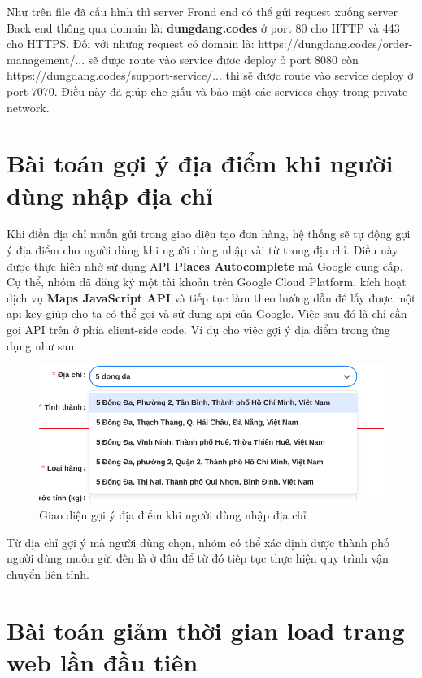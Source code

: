 		Như trên file đã cấu hình thì server Frond end có thể gửi request xuống server Back end thông qua domain là: \textbf{dungdang.codes} ở port 80 cho HTTP và 443 cho HTTPS. Đối với những request có domain là: https://dungdang.codes/order-management/... sẽ được route vào service đươc deploy ở port 8080 còn https://dungdang.codes/support-service/... thì sẽ được route vào service deploy ở port 7070. Điều này đã giúp che giấu và bảo mật các services chạy trong private network.
		
		  \section{Bài toán gợi ý địa điểm khi người dùng nhập địa chỉ}
		  
		  Khi điền địa chỉ muốn gửi trong giao diện tạo đơn hàng, hệ thống sẽ tự động gợi ý địa điểm cho người dùng khi người dùng nhập vài từ trong địa chỉ. Điều này được thực hiện nhờ sử dụng API \textbf{Places Autocomplete} mà Google cung cấp. Cụ thể, nhóm đã đăng ký một tài khoản trên Google Cloud Platform, kích hoạt dịch vụ \textbf{Maps JavaScript API} và tiếp tục làm theo hướng dẫn để lấy được một api key giúp cho ta có thể gọi và sử dụng api của Google. Việc sau đó là chỉ cần gọi API trên ở phía client-side code. Ví dụ cho việc gợi ý địa điểm trong ứng dụng như sau:
		  
		  \begin{figure}[H]
		  	\centering
		  	\includegraphics[width=1\linewidth]{Images/FE_Problems/places_autocomplete}
		  	\linebreak
		  	\caption{Giao diện gợi ý địa điểm khi người dùng nhập địa chỉ}
		  \end{figure}
		
			Từ địa chỉ gợi ý mà người dùng chọn, nhóm có thể xác định được thành phố người dùng muốn gửi đến là ở đâu để từ đó tiếp tục thực hiện quy trình vận chuyển liên tỉnh.
			
			\section{Bài toán giảm thời gian load trang web lần đầu tiên}
			
